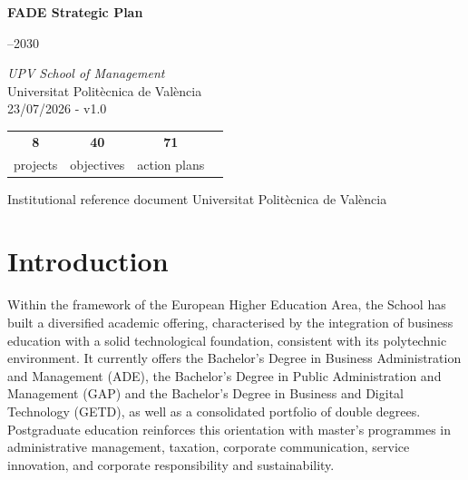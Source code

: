 \documentclass[11pt,a4paper]{scrreprt}
\begin{document}
\begin{titlepage}
\pagecolor{navycolor}
\color{white}
\centering
\vspace*{2cm}


\vspace{2cm}
{\fontsize{30}{38}\selectfont\bfseries FADE Strategic Plan}

\vspace{0.6cm}
{\fontsize{24}{30}--2030}

\vspace{1.2cm}
{\large\itshape UPV School of Management}\\[0.3cm]
{\large Universitat Polit\`ecnica de Val\`encia}\\[0.3cm]
\vspace{1.2cm}
{\large 23/07/2026 - v1.0}

\vspace{3cm}
\begin{tabular}{cccc}
{\Huge\bfseries 8}  & {\Huge\bfseries 40} & {\Huge\bfseries 71}  \\[4pt]
{\small projects}  & {\small objectives}  & {\small action plans} \\
\end{tabular}

\vfill
{\small\color{white!60!navycolor}Institutional reference document \quad\textbullet\quad Universitat Polit\`ecnica de Val\`encia}
\end{titlepage}
\nopagecolor

\tableofcontents
\clearpage

\chapter*{Introduction}
Within the framework of the European Higher Education Area, the School has built a diversified academic offering, characterised by the integration of business education with a solid technological foundation, consistent with its polytechnic environment. It currently offers the Bachelor's Degree in Business Administration and Management (ADE), the Bachelor's Degree in Public Administration and Management (GAP) and the Bachelor's Degree in Business and Digital Technology (GETD), as well as a consolidated portfolio of double degrees. Postgraduate education reinforces this orientation with master's programmes in administrative management, taxation, corporate communication, service innovation, and corporate responsibility and sustainability.
\end{document}
